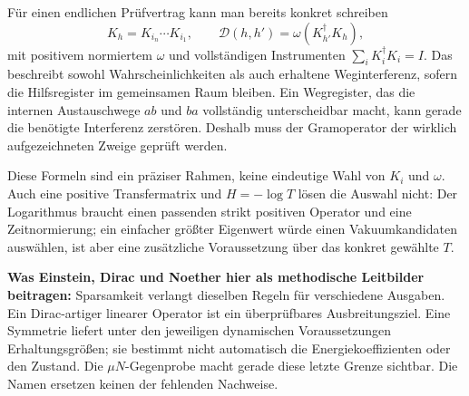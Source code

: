 Für einen endlichen Prüfvertrag kann man bereits konkret schreiben
\begin{equation}
K_h=K_{i_n}\cdots K_{i_1},\qquad
\mathcal D(h,h')=\omega(K_{h'}^\dagger K_h),
\end{equation}
mit positivem normiertem $\omega$ und vollständigen Instrumenten $\sum_iK_i^\dagger K_i=I$. Das beschreibt sowohl Wahrscheinlichkeiten als auch erhaltene Weginterferenz, sofern die Hilfsregister im gemeinsamen Raum bleiben. Ein Wegregister, das die internen Austauschwege $ab$ und $ba$ vollständig unterscheidbar macht, kann gerade die benötigte Interferenz zerstören. Deshalb muss der Gramoperator der wirklich aufgezeichneten Zweige geprüft werden.

Diese Formeln sind ein präziser Rahmen, keine eindeutige Wahl von $K_i$ und $\omega$. Auch eine positive Transfermatrix und $H=-\log T$ lösen die Auswahl nicht: Der Logarithmus braucht einen passenden strikt positiven Operator und eine Zeitnormierung; ein einfacher größter Eigenwert würde einen Vakuumkandidaten auswählen, ist aber eine zusätzliche Voraussetzung über das konkret gewählte $T$.

\textbf{Was Einstein, Dirac und Noether hier als methodische Leitbilder beitragen:} Sparsamkeit verlangt dieselben Regeln für verschiedene Ausgaben. Ein Dirac-artiger linearer Operator ist ein überprüfbares Ausbreitungsziel. Eine Symmetrie liefert unter den jeweiligen dynamischen Voraussetzungen Erhaltungsgrößen; sie bestimmt nicht automatisch die Energiekoeffizienten oder den Zustand. Die $\mu N$-Gegenprobe macht gerade diese letzte Grenze sichtbar. Die Namen ersetzen keinen der fehlenden Nachweise.

